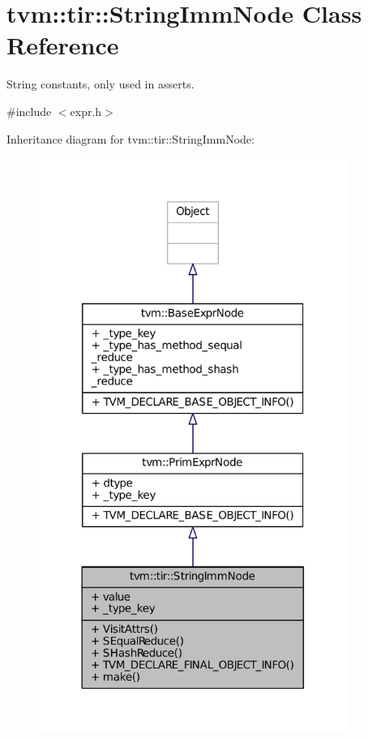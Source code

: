 \hypertarget{classtvm_1_1tir_1_1StringImmNode}{}\section{tvm\+:\+:tir\+:\+:String\+Imm\+Node Class Reference}
\label{classtvm_1_1tir_1_1StringImmNode}


String constants, only used in asserts.  




{\ttfamily \#include $<$expr.\+h$>$}



Inheritance diagram for tvm\+:\+:tir\+:\+:String\+Imm\+Node\+:
\nopagebreak
\begin{figure}[H]
\begin{center}
\leavevmode
\includegraphics[width=285pt]{classtvm_1_1tir_1_1StringImmNode__inherit__graph}
\end{center}
\end{figure}


